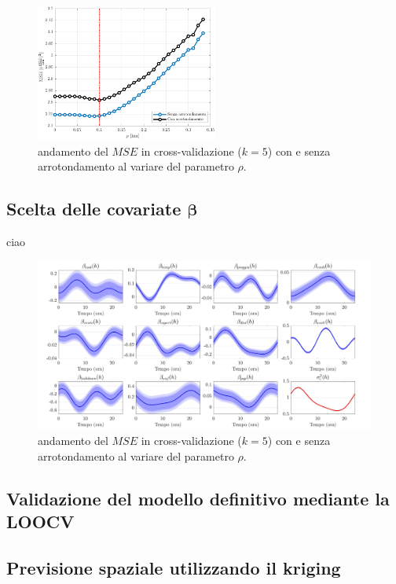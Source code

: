 \begin{figure}[htpb]
	\centering
	\includegraphics[height=170px]{Immagini/4. Caso di studio/Cross_validazione/MSE_rho_full_focus}
	\caption[Andamento del $MSE$ in cross-validazione con e senza arrotondamento al variare del parametro $\rho$]{andamento del $MSE$ in cross-validazione ($k=5$) con e senza arrotondamento al variare del parametro $\rho$.}
	\label{MSE_cv}
\end{figure}

\subsection{Scelta delle covariate $\boldsymbol{\beta}$}
ciao

\begin{figure}[htpb]
	\centering
	\includegraphics[height=215px]{Immagini/4. Caso di studio/Model selection/Trend spline, rho=100m}
	\caption[Andamento del $MSE$ con e senza arrotondamento in cross-validazione al variare del parametro $\rho$]{andamento del $MSE$ in cross-validazione ($k=5$) con e senza arrotondamento al variare del parametro $\rho$.}
	\label{trend_beta}
\end{figure}

\subsection{Validazione del modello definitivo mediante la LOOCV}
\subsection{Previsione spaziale utilizzando il kriging}

